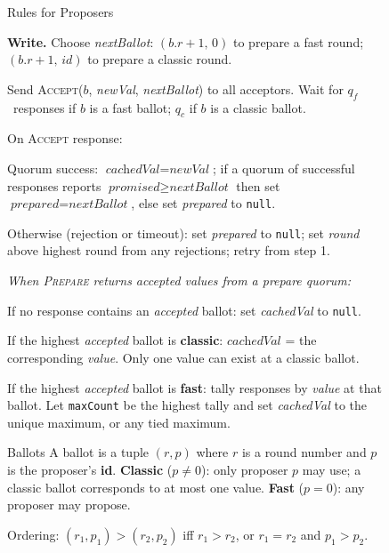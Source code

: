 \begin{figure}[t]
{\begin{minipage}[t]{\protcolwidth}
\begin{protbox}{Rules for Proposers}
\begin{protimpl}
\item \textbf{Write.}\; Choose \textit{nextBallot}: $(b.r{+}1,\, 0)$ to prepare a fast round;\; $(b.r{+}1,\, \textit{id})$ to prepare a classic round.
\item Send \textsc{Accept}($b$, \textit{newVal}, \textit{nextBallot}) to all acceptors. Wait for $q_f$~responses if $b$ is a fast ballot; $q_c$ if $b$ is a classic ballot.
\item On \textsc{Accept} response:
  \begin{protrules}
  \item Quorum success: $\textit{cachedVal} = \textit{newVal}$;\; if a quorum of successful responses reports $\textit{promised} \ge \textit{nextBallot}$ then set $\textit{prepared} = \textit{nextBallot}$, else set \textit{prepared} to \texttt{null}.
  \item Otherwise (rejection or timeout): set \textit{prepared} to \texttt{null}; set \textit{round} above highest round from any rejections; retry from step 1.
  \end{protrules}
\end{protimpl}
\textit{When \textsc{Prepare} returns accepted values from a prepare quorum:}
\begin{protrules}
\item If no response contains an \textit{accepted} ballot: set \textit{cachedVal} to \texttt{null}.
\item If the highest \textit{accepted} ballot is \textbf{classic}: $\textit{cachedVal}$ = the corresponding \textit{value}. Only one value can exist at a classic ballot.
\item If the highest \textit{accepted} ballot is \textbf{fast}: tally responses by \textit{value} at that ballot. Let \texttt{maxCount} be the highest tally and set \textit{cachedVal} to the unique maximum, or any tied maximum.
\end{protrules}
\end{protbox}
\end{minipage}%
\hfill
\begin{minipage}[t]{\protcolwidth}
\begin{protbox}{Ballots}
A ballot is a tuple $(r, p)$ where $r$ is a round number and $p$ is the proposer's \textbf{id}. \textbf{Classic} ($p \neq 0$): only proposer $p$ may use; a classic ballot corresponds to at most one value. \textbf{Fast} ($p = 0$): any proposer may propose.
\par\smallskip\noindent
Ordering: $(r_1, p_1) > (r_2, p_2)$ iff $r_1 > r_2$, or $r_1{=}r_2$ and $p_1 > p_2$.

\end{protbox}
\end{minipage}}
\end{figure}
